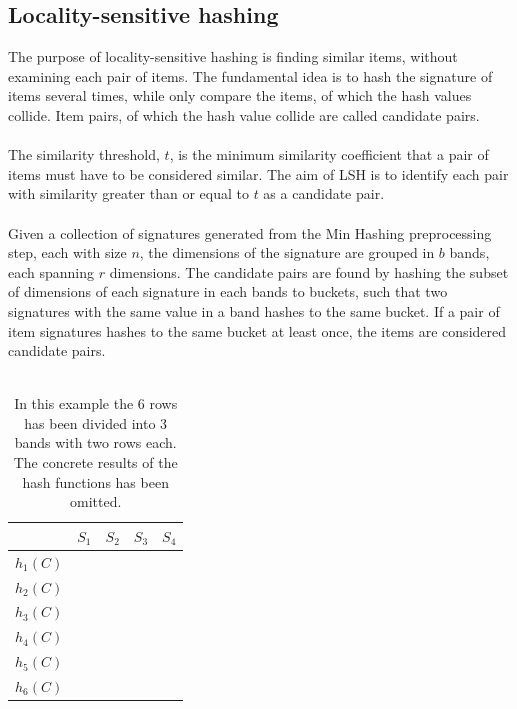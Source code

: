 \subsection{Locality-sensitive hashing}
The purpose of locality-sensitive hashing is finding similar items, without examining each pair of items. The fundamental idea is to hash the signature of items several times, while only compare the items, of which the hash values collide. Item pairs, of which the hash value collide are called candidate pairs.\\ \\
The similarity threshold, \(t\), is the minimum similarity coefficient that a pair of items must have to be considered similar. The aim of LSH is to identify each pair with similarity greater than or equal to \(t\) as a candidate pair.\\ \\
Given a collection of signatures generated from the Min Hashing preprocessing step, each with size \(n\), the dimensions of the signature are grouped in \(b\) bands, each spanning \(r\) dimensions. The candidate pairs are found by hashing the subset of dimensions of each signature in each bands to buckets, such that two signatures with the same value in a band hashes to the same bucket. If a pair of item signatures hashes to the same bucket at least once, the items are considered candidate pairs. \\ \\

\begin{table}[h]
\begin{tabular}{l||l|l|l|l}
& \(S_1\) & \(S_2\) & \(S_3\) & \(S_4\) \\ \hline \hline
\(h_1(C)\) & \cellcolor[HTML]{FD6864} & \cellcolor[HTML]{FD6864}
 & \cellcolor[HTML]{FD6864} & \cellcolor[HTML]{FD6864} \\ \hline
\(h_2(C)\) & \cellcolor[HTML]{FD6864} & \cellcolor[HTML]{FD6864}
 & \cellcolor[HTML]{FD6864} & \cellcolor[HTML]{FD6864} \\ \hline
\(h_3(C)\) & \cellcolor[HTML]{38FFF8} & \cellcolor[HTML]{38FFF8}
 & \cellcolor[HTML]{38FFF8} & \cellcolor[HTML]{38FFF8} \\ \hline
\(h_4(C)\) & \cellcolor[HTML]{38FFF8} & \cellcolor[HTML]{38FFF8}
 & \cellcolor[HTML]{38FFF8} & \cellcolor[HTML]{38FFF8} \\ \hline
\(h_5(C)\) & \cellcolor[HTML]{9AFF99} & \cellcolor[HTML]{9AFF99}
 & \cellcolor[HTML]{9AFF99} & \cellcolor[HTML]{9AFF99} \\ \hline
\(h_6(C)\) & \cellcolor[HTML]{9AFF99} & \cellcolor[HTML]{9AFF99}
 & \cellcolor[HTML]{9AFF99} & \cellcolor[HTML]{9AFF99}
\end{tabular}
\centering
\caption{In this example the 6 rows has been divided into 3 bands with two rows each. The concrete results of the hash functions has been omitted.}
\end{table}

